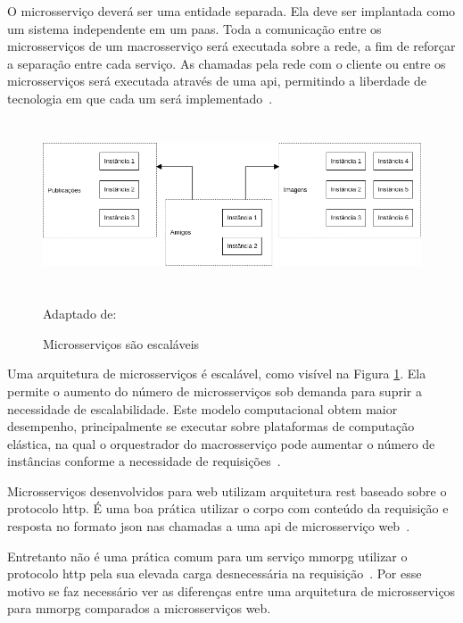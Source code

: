 O microsserviço deverá ser uma entidade separada. Ela deve ser implantada como um sistema independente em um \ac{paas}.
%
Toda a comunicação entre os microsserviços de um macrosserviço será executada sobre a rede, a fim de reforçar a separação entre cada serviço.
%
As chamadas pela rede com o cliente ou entre os microsserviços será executada através de uma \ac{api}, permitindo a liberdade de tecnologia em que cada um será implementado~\cite{Newman2015Feb}.



\begin{figure}[htb!]
\caption{Microsserviços são escaláveis}
\label{fig:microsservicos_escalabilidade}
\includegraphics[height=5cm]{img/cap2/microsservicos_escalabilidade.png}
\centering

Adaptado de:~\cite{Newman2015Feb}
\end{figure}



Uma arquitetura de microsserviços é escalável, como visível na Figura \ref{fig:microsservicos_escalabilidade}.
%
Ela permite o aumento do número de microsserviços sob demanda para suprir a necessidade de escalabilidade.
%
Este modelo computacional obtem maior desempenho, principalmente se executar sobre plataformas de computação elástica, na qual o orquestrador do macrosserviço pode aumentar o número de instâncias conforme a necessidade de requisições~\cite{Nadareishvili2016Aug}.



Microsserviços desenvolvidos para web utilizam arquitetura \ac{rest} baseado sobre o protocolo \ac{http}.
%
É uma boa prática utilizar o corpo com conteúdo da requisição e resposta no formato \ac{json} nas chamadas a uma \ac{api} de microsserviço web~\cite{Nadareishvili2016Aug}.



Entretanto não é uma prática comum para um serviço \ac{mmorpg} utilizar o protocolo \ac{http} pela sua elevada carga desnecessária na requisição~\cite{1417630}.
%
Por esse motivo se faz necessário ver as diferenças entre uma arquitetura de microsserviços para \ac{mmorpg} comparados a microsserviços web.



